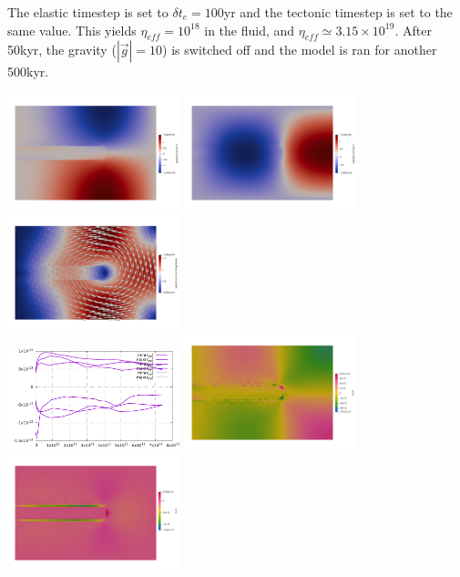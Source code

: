 The elastic timestep is set to $\delta t_e=100$yr and the tectonic timestep is set to the same value.
This yields $\eta_{eff}=10^{18}$ in the fluid, and $\eta_{eff}\simeq 3.15\times 10^{19}$.
After 50kyr, the gravity ($|\vec{g}|=10$) is switched off and the model is ran for another 
500kyr.


\begin{center}
\includegraphics[width=5cm]{python_codes/fieldstone_64/results/beam/u.png}
\includegraphics[width=5cm]{python_codes/fieldstone_64/results/beam/v.png}
\includegraphics[width=5cm]{python_codes/fieldstone_64/results/beam/vel}\\
\includegraphics[width=5cm]{python_codes/fieldstone_64/results/beam/exx}
\includegraphics[width=5cm]{python_codes/fieldstone_64/results/beam/eyy}
\includegraphics[width=5cm]{python_codes/fieldstone_64/results/beam/exy}\\

\end{center}

